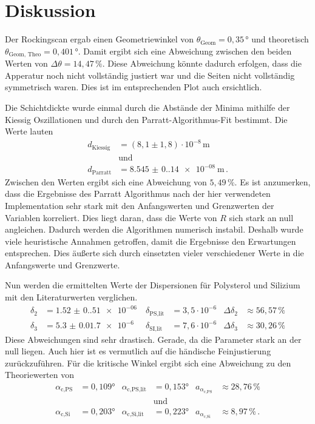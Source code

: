 \section{Diskussion}
\label{sec:Diskussion}

Der Rockingscan ergab einen Geometriewinkel von $\theta_\text{Geom} = 0{,}35 \, \unit\degree$ und theoretisch
$\theta_\text{Geom, Theo} = 0{,}401 \, \unit\degree$.
Damit ergibt sich eine Abweichung zwischen den beiden Werten von $\Delta \theta = 14{,}47 \, \%$.
Diese Abweichung könnte dadurch erfolgen, dass die Apperatur noch nicht vollständig justiert war und die Seiten nicht vollständig symmetrisch waren.
Dies ist im entsprechenden Plot auch ersichtlich.

Die Schichtdickte wurde einmal durch die Abstände der Minima mithilfe der Kiessig Oszillationen und durch den Parratt-Algorithmus-Fit bestimmt.
Die Werte lauten
\begin{align*}
    d_\text{Kiessig} &=  (8{,}1 \pm 1{,}8) \cdot 10^{-8} \, \unit\meter\\
    & \text{und} \\
    d_\text{Parratt} & = \qty{8.545(0.14)e-08}{\unit\meter} \, .
\end{align*}
Zwischen den Werten ergibt sich eine Abweichung von $5{,}49\, \%$.
Es ist anzumerken, dass die Ergebnisse des Parratt Algorithmus nach der hier verwendeten Implementation sehr stark mit den Anfangswerten und Grenzwerten der Variablen korreliert.
Dies liegt daran, dass die Werte von $R$ sich stark an null angleichen.
Dadurch werden die Algorithmen numerisch instabil.
Deshalb wurde viele heuristische Annahmen getroffen, damit die Ergebnisse den Erwartungen entsprechen.
Dies äußerte sich durch einsetzten vieler verschiedener Werte in die Anfangswerte und Grenzwerte.

Nun werden die ermittelten Werte der Dispersionen für Polysterol und Silizium mit den Literaturwerten \cite{v44} verglichen.
\begin{align*}
    \delta_2 &= \qty{1.52(0.51)e-06}{} & \delta_{\text{PS,lit}} &= 3{,}5 \cdot 10^{-6} & \Delta {\delta_2} &\approx 56{,}57\, \% \\
    \delta_3 &= \qty{5.3(0.017)e-6}{} & \delta_{\text{SI,lit}} &= 7{,}6 \cdot 10^{-6} & \Delta {\delta_3} &\approx 30{,}26\, \%
\end{align*}
Diese Abweichungen sind sehr drastisch. Gerade, da die Parameter stark an der null liegen.
Auch hier ist es vermutlich auf die händische Feinjustierung zurückzuführen.
Für die kritische Winkel ergibt sich eine Abweichung zu den Theoriewerten \cite{tolan_xray} von
\begin{align*}
    \alpha_{\text{c,PS}} &= 0{,}109° & \alpha_{\text{c,PS,lit}} &= 0{,}153° & a_{\alpha_{\text{c,PS}}} &\approx 28{,}76 \, \%  \\
    &&&\text{und}&& \\
    \alpha_{\text{c,Si}} &= 0{,}203° & \alpha_{\text{c,Si,lit}} &= 0{,}223° & a_{\alpha_{\text{c,Si}}} &\approx 8{,}97 \, \% \, .
\end{align*}